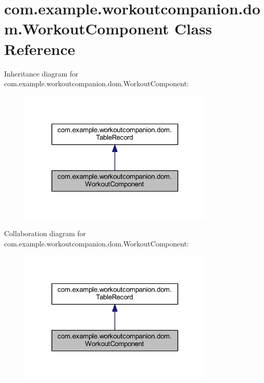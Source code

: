 \hypertarget{classcom_1_1example_1_1workoutcompanion_1_1dom_1_1_workout_component}{\section{com.\-example.\-workoutcompanion.\-dom.\-Workout\-Component Class Reference}
\label{classcom_1_1example_1_1workoutcompanion_1_1dom_1_1_workout_component}
}


Inheritance diagram for com.\-example.\-workoutcompanion.\-dom.\-Workout\-Component\-:\nopagebreak
\begin{figure}[H]
\begin{center}
\leavevmode
\includegraphics[width=264pt]{classcom_1_1example_1_1workoutcompanion_1_1dom_1_1_workout_component__inherit__graph}
\end{center}
\end{figure}


Collaboration diagram for com.\-example.\-workoutcompanion.\-dom.\-Workout\-Component\-:\nopagebreak
\begin{figure}[H]
\begin{center}
\leavevmode
\includegraphics[width=264pt]{classcom_1_1example_1_1workoutcompanion_1_1dom_1_1_workout_component__coll__graph}
\end{center}
\end{figure}
